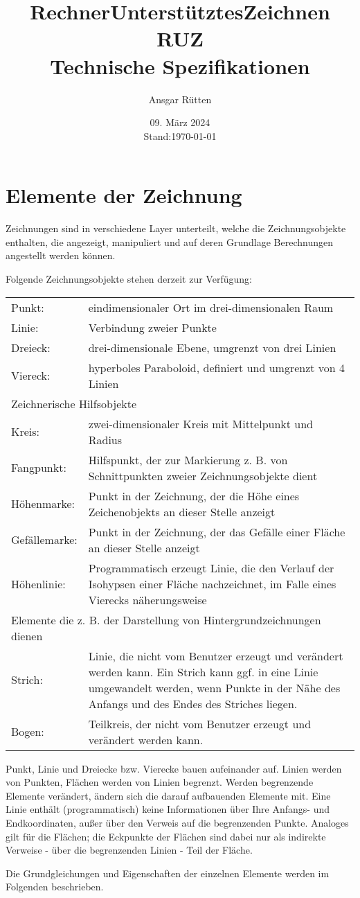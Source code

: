 \documentclass[ngerman]{report}
\title{\textbf{R}echner\textbf{U}nterstütztes\textbf{Z}eichnen RUZ\\Technische Spezifikationen}
\author{Ansgar Rütten}
\date{09. März 2024\\Stand:\today}
\begin{document}
\maketitle
\newpage
\tableofcontents
\newpage
\chapter{Elemente der Zeichnung}
Zeichnungen sind in verschiedene Layer unterteilt, welche die Zeichnungsobjekte enthalten, die angezeigt, manipuliert und auf deren Grundlage Berechnungen angestellt werden können.

Folgende Zeichnungsobjekte stehen derzeit zur Verfügung:

\begin{tabular}{p{2cm} p{9cm}}
	\toprule
	Punkt:		&eindimensionaler Ort im drei-dimensionalen Raum \\
	Linie:			&Verbindung zweier Punkte \\
	Dreieck:		&drei-dimensionale Ebene, umgrenzt von drei Linien \\
	Viereck:		&hyperboles Paraboloid, definiert und umgrenzt von 4 Linien \\
	\midrule
	\multicolumn{2}{l}{Zeichnerische Hilfsobjekte} \\
	\midrule
	Kreis:			&zwei-dimensionaler Kreis mit Mittelpunkt und Radius \\
	Fangpunkt:		&Hilfspunkt, der zur Markierung z. B. von Schnittpunkten zweier Zeichnungsobjekte dient \\
	Höhenmarke:	&Punkt in der Zeichnung, der die Höhe eines Zeichenobjekts an dieser Stelle anzeigt \\
	Gefällemarke:	&Punkt in der Zeichnung, der das Gefälle einer Fläche an dieser Stelle anzeigt \\
	Höhenlinie:		&Programmatisch erzeugt Linie, die den Verlauf der Isohypsen einer Fläche nachzeichnet, im Falle eines Vierecks näherungsweise \\
	\midrule
	\multicolumn{2}{l}{Elemente die z. B. der Darstellung von Hintergrundzeichnungen dienen} \\
	\midrule
	Strich:		&Linie, die nicht vom Benutzer erzeugt und verändert werden kann. Ein Strich kann ggf. in eine Linie umgewandelt werden, wenn Punkte in der Nähe des Anfangs und des Endes des Striches liegen. \\
	Bogen:		&Teilkreis, der nicht vom Benutzer erzeugt und verändert werden kann. \\
	\bottomrule
\end{tabular}

Punkt, Linie und Dreiecke bzw. Vierecke bauen aufeinander auf. Linien werden von Punkten, Flächen werden von Linien begrenzt. Werden begrenzende Elemente verändert, ändern sich die darauf aufbauenden Elemente mit. Eine Linie enthält (programmatisch) keine Informationen über Ihre Anfangs- und Endkoordinaten, außer über den Verweis auf die begrenzenden Punkte. Analoges gilt für die Flächen; die Eckpunkte der Flächen sind dabei nur als indirekte Verweise - über die begrenzenden Linien - Teil der Fläche.

Die Grundgleichungen und Eigenschaften der einzelnen Elemente werden im Folgenden beschrieben.


\end{document}
